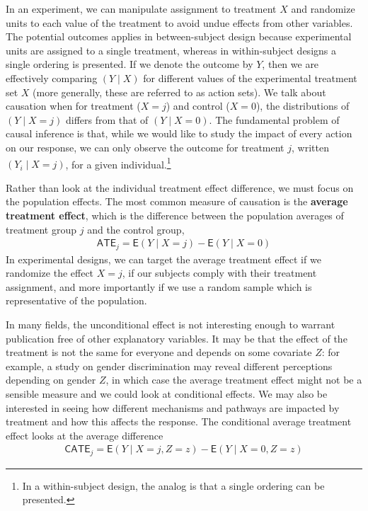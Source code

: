 \documentclass[
  11pt,
  letterpaper,
]{scrbook}
\theoremstyle{definition}
\theoremstyle{remark}
\begin{document}
In an experiment, we can manipulate assignment to treatment \(X\) and
randomize units to each value of the treatment to avoid undue effects
from other variables. The potential outcomes applies in between-subject
design because experimental units are assigned to a single treatment,
whereas in within-subject designs a single ordering is presented. If we
denote the outcome by \(Y\), then we are effectively comparing
\((Y \mid X)\) for different values of the experimental treatment set
\(X\) (more generally, these are referred to as action sets). We talk
about causation when for treatment (\(X=j\)) and control (\(X=0\)), the
distributions of \((Y \mid X=j)\) differs from that of \((Y \mid X=0)\).
The fundamental problem of causal inference is that, while we would like
to study the impact of every action on our response, we can only observe
the outcome for treatment \(j\), written \((Y_i \mid X=j)\), for a given
individual.\footnote{In a within-subject design, the analog is that a
  single ordering can be presented.}

Rather than look at the individual treatment effect difference, we must
focus on the population effects. The most common measure of causation is
the \textbf{average treatment effect}, which is the difference between
the population averages of treatment group \(j\) and the control group,
\begin{align*}
\textsf{ATE}_j = \mathsf{E}(Y \mid X=j) - \mathsf{E}(Y \mid X=0)
\end{align*} In experimental designs, we can target the average
treatment effect if we randomize the effect \(X=j\), if our subjects
comply with their treatment assignment, and more importantly if we use a
random sample which is representative of the population.

In many fields, the unconditional effect is not interesting enough to
warrant publication free of other explanatory variables. It may be that
the effect of the treatment is not the same for everyone and depends on
some covariate \(Z\): for example, a study on gender discrimination may
reveal different perceptions depending on gender \(Z\), in which case
the average treatment effect might not be a sensible measure and we
could look at conditional effects. We may also be interested in seeing
how different mechanisms and pathways are impacted by treatment and how
this affects the response. The conditional average treatment effect
looks at the average difference \begin{align*}
\textsf{CATE}_j = \mathsf{E}(Y \mid X=j, Z = z) - \mathsf{E}(Y \mid X=0, Z = z)
\end{align*}
\end{document}
